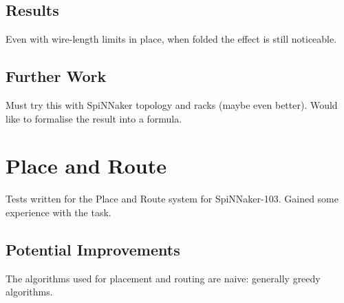 		\subsection{Results}
			
			Even with wire-length limits in place, when folded the effect is still
			noticeable.
		
		\subsection{Further Work}
			
			Must try this with SpiNNaker topology and racks (maybe even better). Would
			like to formalise the result into a formula.
	
	\section{Place and Route}
		
		Tests written for the Place and Route system for SpiNNaker-103. Gained some
		experience with the task. 
		
		\subsection{Potential Improvements}
			
			The algorithms used for placement and routing are naive: generally greedy
			algorithms.



